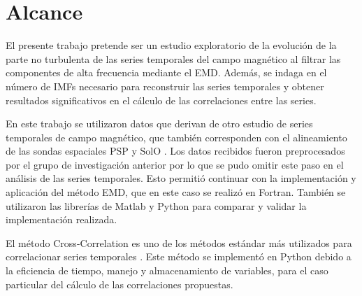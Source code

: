 \section{Alcance}

\noindent El presente trabajo pretende ser un estudio exploratorio de la evolución de la parte no turbulenta de las series temporales del campo magnético al filtrar las componentes de alta frecuencia mediante el EMD. Además, se indaga en el número de IMFs necesario para reconstruir las series temporales y obtener resultados significativos en el cálculo de las correlaciones entre las series.

En este trabajo se utilizaron datos que derivan de otro estudio de series temporales de campo magnético, que también corresponden con el alineamiento de las sondas espaciales PSP y SolO \cite{telloni_evolution_2021}. Los datos recibidos fueron preprocesados por el grupo de investigación anterior por lo que se pudo omitir este paso en el análisis de las series temporales. Esto permitió continuar con la implementación y aplicación del método EMD, que en este caso se realizó en Fortran. También se utilizaron las librerías de Matlab y Python para comparar y validar la implementación realizada. 

El método Cross-Correlation es uno de los métodos estándar más utilizados para correlacionar series temporales \cite{chatfield_analysis_2019}. Este método se implementó en Python debido a la eficiencia de tiempo, manejo y almacenamiento de variables, para el caso particular del cálculo de las correlaciones propuestas. 